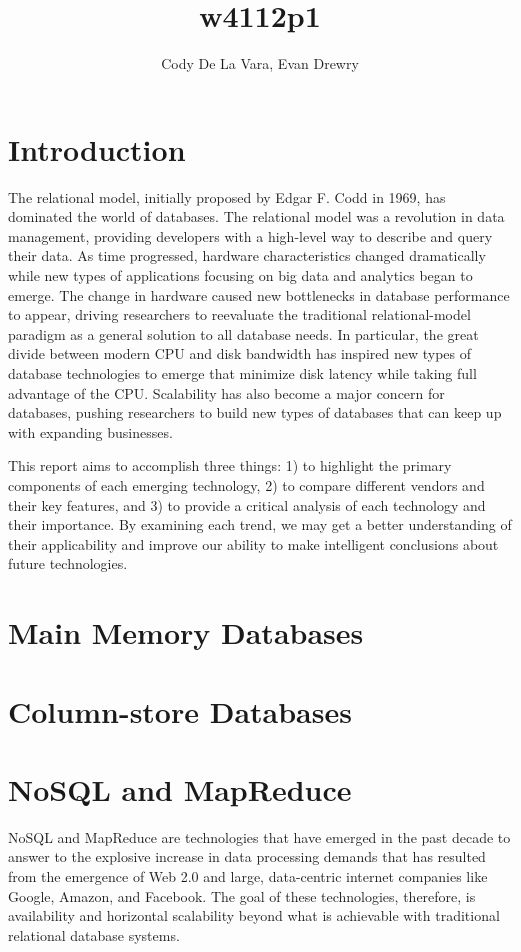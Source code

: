 \documentclass[11pt,a4paper]{report}
\author{Cody De La Vara, Evan Drewry}
\title{w4112p1}
\begin{document}
\maketitle
\section*{Introduction}
The relational model, initially proposed by Edgar F. Codd in 1969, has dominated the world of databases.\cite{cod70} The relational model was a revolution in data management, providing developers with a high-level way to describe and query their data. \cite{cod70} As time progressed, hardware characteristics changed dramatically while new types of applications focusing on big data and analytics began to emerge. The change in hardware caused new bottlenecks in database performance to appear, driving researchers to reevaluate the traditional relational-model paradigm as a general solution to all database needs. In particular, the great divide between modern CPU and disk bandwidth has inspired new types of database technologies to emerge that minimize disk latency while taking full advantage of the CPU. Scalability has also become a major concern for databases, pushing researchers to build new types of databases that can keep up with expanding businesses.

This report aims to accomplish three things: 1) to highlight the primary components of each emerging technology, 2) to compare different vendors and their key features, and 3) to provide a critical analysis of each technology and their importance.  By examining each trend, we may get a better understanding of their applicability and improve our ability to make intelligent conclusions about future technologies.

\section*{Main Memory Databases}
\section*{Column-store Databases}

\section*{NoSQL and MapReduce}
NoSQL and MapReduce are technologies that have emerged in the past decade to answer to the explosive increase in data processing demands that has resulted from the emergence of Web 2.0 and large, data-centric internet companies like Google, Amazon, and Facebook.\cite{leavitt2010will} The goal of these technologies, therefore, is availability and horizontal scalability beyond what is achievable with traditional relational database systems.
\end{document}
